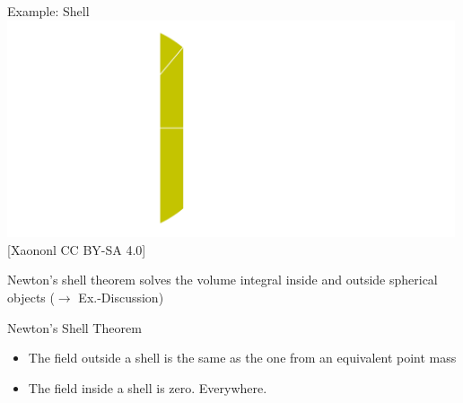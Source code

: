 \begin{frame}
\begin{PointSix}{Example: Shell}
  \includegraphics[width=0.99\textwidth]{Figures/Gravity/Exported/Shell-diag_reversed_CCBYSA4_0_Xaonon.png}
  \tiny [Xaononl CC BY-SA 4.0]

  \small Newton's shell theorem solves the volume integral inside and outside spherical objects ($\rightarrow$ Ex.-Discussion)
\end{PointSix}

\end{frame}

\begin{frame}
\begin{PointSix}{Newton's Shell Theorem}
 \begin{itemize}
    \item The field outside a shell is the same as the one from an equivalent point mass
    \item The field inside a shell is zero. Everywhere.
 \end{itemize}
\end{PointSix}
\end{frame}

